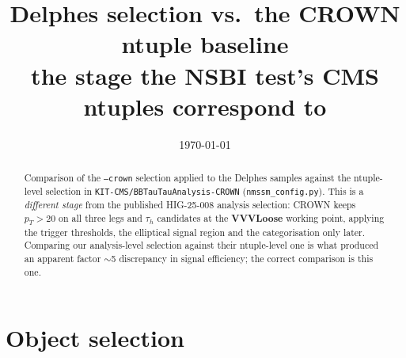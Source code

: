 \documentclass[11pt,a4paper]{article}
\title{\vspace{-1.5cm}Delphes selection vs.\ the CROWN ntuple baseline\\
\large the stage the NSBI test's CMS ntuples correspond to}
\author{}
\date{\today}
\newcommand{\tauh}{\tau_{h}}
\newcommand{\pt}{p_{T}}
\begin{document}
\maketitle
\vspace{-0.8cm}

\begin{abstract}
\noindent
Comparison of the \texttt{--crown} selection applied to the Delphes samples against the
ntuple-level selection in \texttt{KIT-CMS/BBTauTauAnalysis-CROWN}
(\texttt{nmssm\_config.py}). This is a \emph{different stage} from the published
HIG-25-008 analysis selection: CROWN keeps $\pt>20$ on all three legs and $\tauh$
candidates at the \textbf{VVVLoose} working point, applying the trigger thresholds,
the elliptical signal region and the categorisation only later. Comparing our
analysis-level selection against their ntuple-level one is what produced an apparent
factor $\sim$5 discrepancy in signal efficiency; the correct comparison is this one.
\end{abstract}

\section{Object selection}
\end{document}
